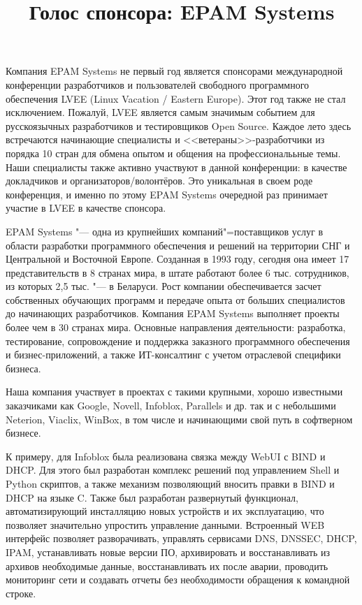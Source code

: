 \documentclass[10pt, a5paper]{article}
\begin{document}
\title{Голос спонсора: EPAM Systems}
\date{}
\maketitle

Компания EPAM Systems не первый год является спонсорами международной конференции разработчиков и пользователей свободного программного обеспечения LVEE (Linux Vacation / Eastern Europe). Этот год также не стал исключением. Пожалуй, LVEE является самым значимым событием для русскоязычных разработчиков и тестировщиков Open Source. Каждое лето здесь встречаются начинающие специалисты и <<ветераны>>-разработчики из порядка 10 стран для обмена опытом и общения на профессиональьные темы. Наши специалисты также активно участвуют в данной конференции: в качестве докладчиков и организаторов/волонтёров. Это уникальная в своем роде конференция, и именно по этому EPAM Systems очередной раз принимает участие в LVEE в качестве спонсора. 

EPAM Systems "--- одна из крупнейших компаний"=поставщиков \linebreak услуг в области разработки программного обеспечения и решений на территории СНГ и  Центральной и Восточной Европе. Созданная в 1993 году, сегодня она имеет 17 представительств в 8 странах мира, в штате работают более 6 тыс. сотрудников, из которых 2,5 тыс. "--- в Беларуси. Рост компании обеспечивается засчет собственных обучающих программ и передаче опыта от больших специалистов до начинающих разработчиков. Компания EPAM Systems выполняет проекты более чем в 30 странах мира. Основные направления деятельности: разработка, тестирование, сопровождение и поддержка заказного программного обеспечения и бизнес-приложений, а также ИТ-консалтинг с учетом отраслевой специфики бизнеса.

Наша компания участвует в проектах с такими крупными, хорошо известными заказчиками как Google, Novell, Infoblox, Parallels и др. так и с небольшими Neterion, Viaclix, WinBox, в том числе и начинающими свой путь в софтверном бизнесе.

К примеру, для Infoblox была реализована связка между WebUI с BIND и DHCP. Для этого был разработан комплекс решений под управлением Shell и Python скриптов, а также механизм позволяющий вносить правки в BIND и DHCP на языке C. Также был разработан развернутый функционал, автоматизирующий инсталляцию новых устройств и их эксплуатацию, что позволяет значительно упростить управление данными.  Встроенный WEB интерфейс позволяет разворачивать, управлять сервисами DNS, DNSSEC, DHCP, IPAM, устанавливать новые версии ПО, архивировать и восстанавливать из архивов необходимые данные, восстанавливать их после аварии, проводить мониторинг сети и создавать отчеты без необходимости обращения к командной строке. 
\end{document}
